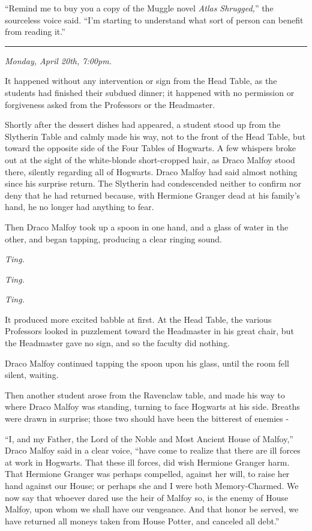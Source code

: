``Remind me to buy you a copy of the Muggle novel \emph{Atlas
Shrugged,}'' the sourceless voice said. ``I'm starting to understand
what sort of person can benefit from reading it.''

\begin{center}\rule{3in}{0.4pt}\end{center}

\emph{Monday, April 20th, 7:00pm.}

It happened without any intervention or sign from the Head Table, as the
students had finished their subdued dinner; it happened with no
permission or forgiveness asked from the Professors or the Headmaster.

Shortly after the dessert dishes had appeared, a student stood up from
the Slytherin Table and calmly made his way, not to the front of the
Head Table, but toward the opposite side of the Four Tables of Hogwarts.
A few whispers broke out at the sight of the white-blonde short-cropped
hair, as Draco Malfoy stood there, silently regarding all of Hogwarts.
Draco Malfoy had said almost nothing since his surprise return. The
Slytherin had condescended neither to confirm nor deny that he had
returned because, with Hermione Granger dead at his family's hand, he no
longer had anything to fear.

Then Draco Malfoy took up a spoon in one hand, and a glass of water in
the other, and began tapping, producing a clear ringing sound.

\emph{Ting.}

\emph{Ting.}

\emph{Ting.}

It produced more excited babble at first. At the Head Table, the various
Professors looked in puzzlement toward the Headmaster in his great
chair, but the Headmaster gave no sign, and so the faculty did nothing.

Draco Malfoy continued tapping the spoon upon his glass, until the room
fell silent, waiting.

Then another student arose from the Ravenclaw table, and made his way to
where Draco Malfoy was standing, turning to face Hogwarts at his side.
Breaths were drawn in surprise; those two should have been the bitterest
of enemies -

``I, and my Father, the Lord of the Noble and Most Ancient House of
Malfoy,'' Draco Malfoy said in a clear voice, ``have come to realize
that there are ill forces at work in Hogwarts. That these ill forces,
did wish Hermione Granger harm. That Hermione Granger was perhaps
compelled, against her will, to raise her hand against our House; or
perhaps she and I were both Memory-Charmed. We now say that whoever
dared use the heir of Malfoy so, is the enemy of House Malfoy, upon whom
we shall have our vengeance. And that honor be served, we have returned
all moneys taken from House Potter, and canceled all debt.''

